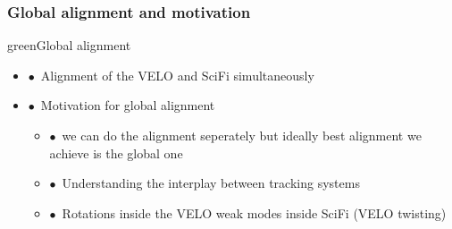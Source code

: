 \documentclass[aspectratio=1610, 12pt, xcolor=dvipsnames]{beamer}
\begin{document}
\begin{frame}\frametitle{Global alignment and motivation}
  \begin{mybox}{green}{Global alignment}
    \begin{itemize}
      \item $\bullet$\, Alignment of the VELO and SciFi simultaneously
    \end{itemize}
    \begin{itemize}
      \setlength\itemsep{0em}
      \item $\bullet$\, Motivation for global alignment
      \begin{itemize}
        \item $\bullet$\, we can do the alignment seperately but ideally best alignment we achieve is the global one
        \item $\bullet$\, Understanding the interplay between tracking systems
        \item $\bullet$\, Rotations inside the VELO \to weak modes inside SciFi (VELO twisting)
      \end{itemize}
    \end{itemize}
  \end{mybox}
\end{frame}
\end{document}
